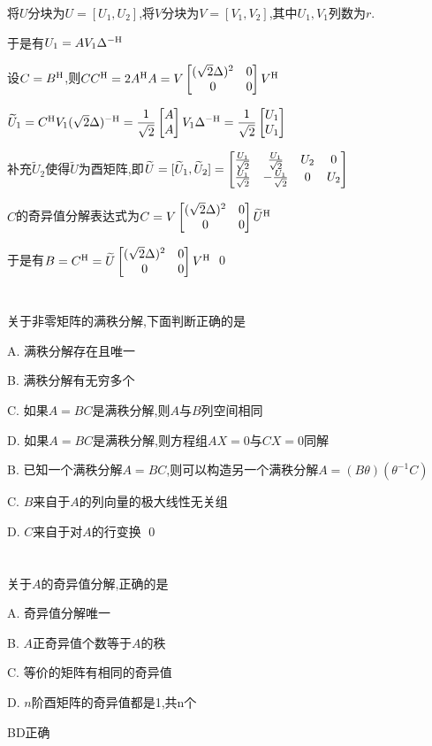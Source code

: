 \documentclass{matrix-homework}
\begin{document}
\answer
将$U$分块为$U=[U_1,U_2]$,将$V$分块为$V=[V_1,V_2]$,其中$U_1,V_1$列数为$r$.

于是有$U_1=A V_1 \Delta^{-\mathrm{H}}$

设$C=B^{\mathrm{H}}$,则$CC^{\mathrm{H}}=2A^{\mathrm{H}} A=V\begin{bmatrix}(\sqrt{2}\Delta)^2& 0\\0&0\end{bmatrix}V^{\mathrm{H}}$

$\widetilde{U}_1=C^{\mathrm{H}} V_1 (\sqrt{2}\Delta)^{-\mathrm{H}}=\dfrac{1}{\sqrt{2}}\begin{bmatrix}A\\A\end{bmatrix}V_1\Delta^{-\mathrm{H}}=\dfrac{1}{\sqrt{2}}\begin{bmatrix}U_1\\U_1\end{bmatrix}$

补充$\widetilde{U}_2$使得$\widetilde{U}$为酉矩阵,即$\widetilde{U}=[\widetilde{U}_1,\widetilde{U}_2]=\begin{bmatrix}\frac{U_1}{\sqrt{2}} & \frac{U_1}{\sqrt{2}} & U_2 & 0 \\ \frac{U_1}{\sqrt{2}} & -\frac{U_1}{\sqrt{2}} & 0 & U_2\end{bmatrix}$

$C$的奇异值分解表达式为$C=V\begin{bmatrix}(\sqrt{2}\Delta)^2& 0\\0&0\end{bmatrix}\widetilde{U}^{\mathrm{H}}$

于是有$B=C^{\mathrm{H}}=\widetilde{U}\begin{bmatrix}(\sqrt{2}\Delta)^2& 0\\0&0\end{bmatrix}V^{\mathrm{H}}$
\qed

\section{}
关于非零矩阵的满秩分解,下面判断正确的是

A. 满秩分解存在且唯一

B. 满秩分解有无穷多个

C. 如果$A=BC$是满秩分解,则$A$与$B$列空间相同

D. 如果$A=BC$是满秩分解,则方程组$AX=0$与$CX=0$同解

\answer
B. 已知一个满秩分解$A=BC$,则可以构造另一个满秩分解$A=(B\theta)(\theta^{-1}C)$

C. $B$来自于$A$的列向量的极大线性无关组

D. $C$来自于对$A$的行变换
\qed


\section{}
关于$A$的奇异值分解,正确的是

A. 奇异值分解唯一

B. $A$正奇异值个数等于$A$的秩

C. 等价的矩阵有相同的奇异值

D. $n$阶酉矩阵的奇异值都是1,共n个


\answer
BD正确
\end{document}

